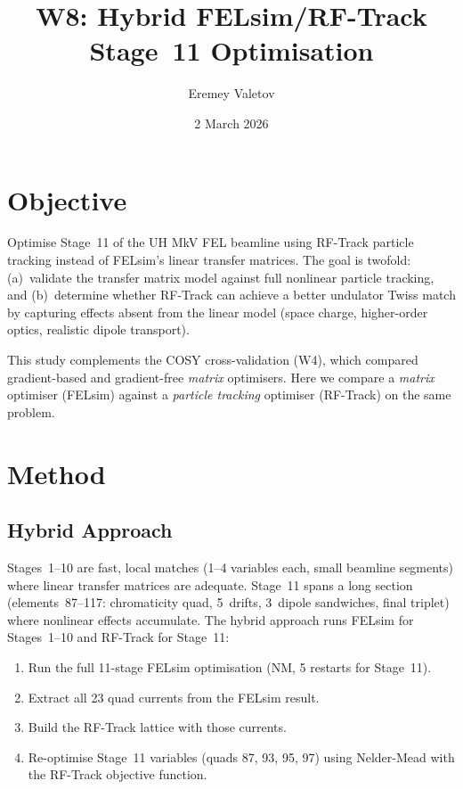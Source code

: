 \documentclass[11pt]{article}
\title{W8: Hybrid FELsim/RF-Track Stage~11 Optimisation}
\author{Eremey Valetov}
\date{2 March 2026}
\begin{document}
\maketitle

\section{Objective}

Optimise Stage~11 of the UH MkV FEL beamline using RF-Track particle tracking
instead of FELsim's linear transfer matrices.  The goal is twofold: (a)~validate
the transfer matrix model against full nonlinear particle tracking, and
(b)~determine whether RF-Track can achieve a better undulator Twiss match by
capturing effects absent from the linear model (space charge, higher-order optics,
realistic dipole transport).

This study complements the COSY cross-validation (W4), which compared
gradient-based and gradient-free \emph{matrix} optimisers.  Here we compare
a \emph{matrix} optimiser (FELsim) against a \emph{particle tracking} optimiser
(RF-Track) on the same problem.


\section{Method}

\subsection{Hybrid Approach}

Stages~1--10 are fast, local matches (1--4 variables each, small beamline
segments) where linear transfer matrices are adequate.  Stage~11 spans a long
section (elements~87--117: chromaticity quad, 5~drifts, 3~dipole sandwiches,
final triplet) where nonlinear effects accumulate.  The hybrid approach runs
FELsim for Stages~1--10 and RF-Track for Stage~11:

\begin{enumerate}
  \item Run the full 11-stage FELsim optimisation (NM, 5 restarts for Stage~11).
  \item Extract all 23 quad currents from the FELsim result.
  \item Build the RF-Track lattice with those currents.
  \item Re-optimise Stage~11 variables (quads 87, 93, 95, 97) using
    Nelder-Mead with the RF-Track objective function.
\end{enumerate}
\end{document}
